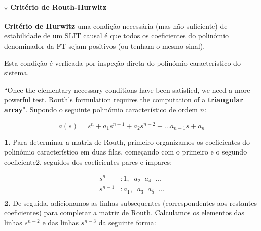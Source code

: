 \paragraph[2.2.2.1 Critério de Routh-Hurwitz]{$\pmb{\star}$ Critério de Routh-Hurwitz}

{

\begin{mdframed}
\textbf{Critério de Hurwitz} uma condição necessária (mas não suficiente) de estabilidade de um SLIT causal é que todos os coeficientes do polinómio denominador da FT sejam positivos (ou tenham o mesmo sinal).
\end{mdframed}
}

\noindent Esta condição é verficada por inspeção direta do polinómio característico do sistema.

\newpage
\noindent ``Once the elementary necessary conditions have been satisfied, we need a more powerful test. Routh’s formulation requires the computation of a \textbf{triangular array}".\cite{FranklinPowell2015} Supondo o seguinte polinómio característico de ordem $n$:

$$
    a(s) = s^n + a_1 s^{n - 1} + a_2 s^{n - 2} + \dots a_{n -1} s + a_n
$$

\noindent \textbf{1.} Para determinar a matriz de Routh, primeiro organizamos os coeficientes do polinómio característico em duas filas, começando com o primeiro e o segundo coeficiente2, seguidos dos coeficientes pares e ímpares:

$$
    \begin{aligned}
        s^n&: 1,\;\; a_2\;\; a_4\;\; \dots\\
        s^{n-1}&: a_1,\;\; a_3\;\; a_5\;\; \dots\\
    \end{aligned}
$$
\noindent\textbf{2.} De seguida, adicionamos as linhas subsequentes (correspondentes aos restantes coeficientes) para completar a matriz de Routh. Calculamos os elementos das linhas $s^{n - 2}$ e das linhas $s^{n - 3}$ da seguinte forma:

